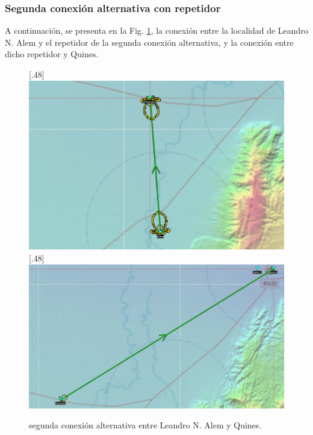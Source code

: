 \documentclass[11pt,a4paper]{article}
\begin{document}
\clearpage

\subsubsection{Segunda conexión alternativa con repetidor}

A continuación, se presenta en la Fig. \ref{fig:con_alt2}, la conexión entre la localidad de Leandro N. Alem y el repetidor de la segunda conexión alternativa, y la conexión entre dicho repetidor y Quines.


\begin{figure}[ht!]
  \centering
  [.48\linewidth]{\includegraphics[height=8.5\baselineskip]{fotos_ema/con_alt2_alem_rep.jpg}}%
  \hfill%
  [.48\linewidth]{\includegraphics[height=8.5\baselineskip]{fotos_ema/con_alt2_rep_quines.jpg}}
  \caption{segunda conexión alternativa entre Leandro N. Alem y Quines.}
  \label{fig:con_alt2}
\end{figure}
\end{document}
